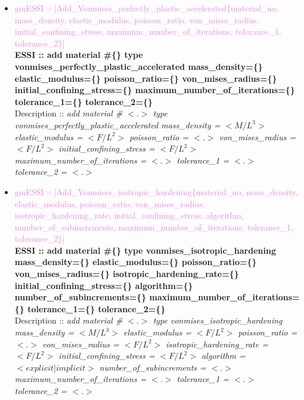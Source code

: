 \documentclass[11pt]{article}
\begin{document}
\begin{itemize}
      \item \textcolor{violet}{gmESSI :: [Add\_Vonmises\_perfectly\_plastic\_accelerated\{material\_no, mass\_density, elastic\_modulus, poisson\_ratio, von\_mises\_radius, initial\_confining\_stress, maximum\_number\_of\_iterations, tolerance\_1, tolerance\_2\}]}\\
      \textbf{ESSI :: add material \#\{\} type vonmises\_perfectly\_plastic\_accelerated mass\_density=\{\} elastic\_modulus=\{\} poisson\_ratio=\{\} von\_mises\_radius=\{\} initial\_confining\_stress=\{\}  maximum\_number\_of\_iterations=\{\}  tolerance\_1=\{\}  tolerance\_2=\{\} }\\
      Description ::  \textit{ add material \# $<.>$ type vonmises\_perfectly\_plastic\_accelerated mass\_density = $<M/L^3>$ elastic\_modulus = $<F/L^2>$ poisson\_ratio = $<.>$ von\_mises\_radius = $<F/L^2>$ initial\_confining\_stress = $<F/L^2>$  maximum\_number\_of\_iterations = $<.>$ tolerance\_1 = $<.>$ tolerance\_2 = $<.>$} 

      \item \textcolor{violet}{gmESSI :: [Add\_Vonmises\_isotropic\_hardening\{material\_no, mass\_density, elastic\_modulus, poisson\_ratio, von\_mises\_radius, isotropic\_hardening\_rate, initial\_confining\_stress, algorithm, number\_of\_subincrements, maximum\_number\_of\_iterations, tolerance\_1, tolerance\_2\}]}\\
      \textbf{ESSI :: add material \#\{\} type vonmises\_isotropic\_hardening mass\_density=\{\} elastic\_modulus=\{\}  poisson\_ratio=\{\}  von\_mises\_radius=\{\}  isotropic\_hardening\_rate=\{\}  initial\_confining\_stress=\{\} algorithm=\{\}  number\_of\_subincrements=\{\}  maximum\_number\_of\_iterations=\{\}  tolerance\_1=\{\}  tolerance\_2=\{\} }\\
      Description ::  \textit{ add material \# $<.>$ type vonmises\_isotropic\_hardening mass\_density = $<M/L^3>$ elastic\_modulus = $<F/L^2>$ poisson\_ratio = $<.>$ von\_mises\_radius = $<F/L^2>$ isotropic\_hardening\_rate = $<F/L^2>$ initial\_confining\_stress = $<F/L^2>$ algorithm = $<explicit|implicit>$ number\_of\_subincrements = $<.>$ maximum\_number\_of\_iterations = $<.>$ tolerance\_1 = $<.>$ tolerance\_2 = $<.>$} 


\end{itemize}
\end{document}
